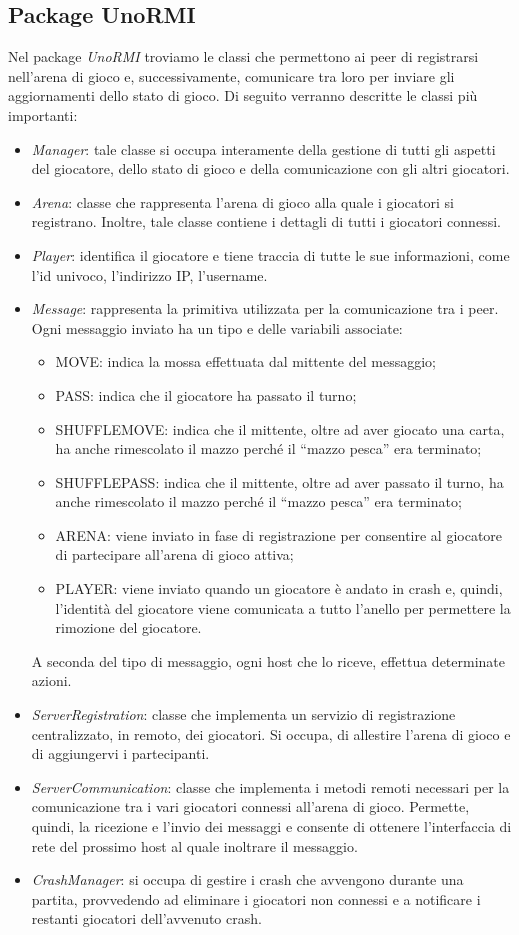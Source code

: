 \documentclass[11pt]{article} %
\begin{document}
\subsection{Package UnoRMI}
Nel package \emph{UnoRMI} troviamo le classi che permettono ai peer di registrarsi nell'arena di gioco e, successivamente, comunicare tra loro per inviare 
gli aggiornamenti dello stato di gioco. Di seguito verranno descritte le classi più importanti:
\begin{itemize}
 \item \emph{Manager}: tale classe si occupa interamente della gestione di tutti gli aspetti del giocatore, dello stato di gioco e della comunicazione 
 con gli altri giocatori. 
 \item \emph{Arena}: classe che rappresenta l'arena di gioco alla quale i giocatori si registrano. Inoltre, tale classe contiene i dettagli di tutti i giocatori
 connessi.
 \item \emph{Player}: identifica il giocatore e tiene traccia di tutte le sue informazioni, come l'id univoco, l'indirizzo IP, l'username.
 \item \emph{Message}: rappresenta la primitiva utilizzata per la comunicazione tra i peer. Ogni messaggio inviato ha un tipo e delle variabili associate:
 \begin{itemize}
  \item MOVE: indica la mossa effettuata dal mittente del messaggio;
  \item PASS: indica che il giocatore ha passato il turno;
  \item SHUFFLEMOVE: indica che il mittente, oltre ad aver giocato una carta, ha anche rimescolato il mazzo perché il ``mazzo pesca'' era terminato;  
  \item SHUFFLEPASS: indica che il mittente, oltre ad aver passato il turno, ha anche rimescolato il mazzo perché il ``mazzo pesca'' era terminato;
  \item ARENA: viene inviato in fase di registrazione per consentire al giocatore di partecipare all'arena di gioco attiva;
  \item PLAYER: viene inviato quando un giocatore è andato in crash e, quindi, l'identità del giocatore viene comunicata a tutto l'anello per permettere 
  la rimozione del giocatore.
 \end{itemize}
 A seconda del tipo di messaggio, ogni host che lo riceve, effettua determinate azioni.
 \item \emph{ServerRegistration}: classe che implementa un servizio di registrazione centralizzato, in remoto, dei giocatori. Si occupa, di allestire l'arena
 di gioco e di aggiungervi i partecipanti.
 \item \emph{ServerCommunication}: classe che implementa i metodi remoti necessari per la comunicazione tra i vari giocatori connessi all'arena di gioco. 
 Permette, quindi, la ricezione e l'invio dei messaggi e consente di ottenere l'interfaccia di rete del prossimo host al quale inoltrare il messaggio.
 \item \emph{CrashManager}: si occupa di gestire i crash che avvengono durante una partita, provvedendo ad eliminare i giocatori non connessi e a notificare
 i restanti giocatori dell'avvenuto crash.
\end{itemize}
\end{document}
